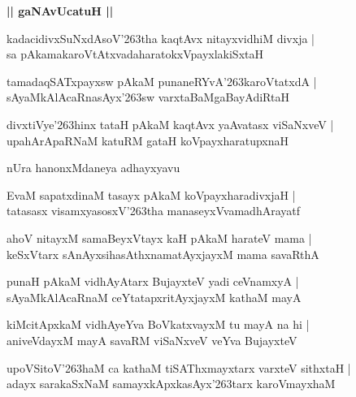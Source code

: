 \documentclass[twoside,12pt,openright]{book}
\def\S{\char'263}
\newcounter{shloka}[chapter]
\def\uvaca#1{\centerline{{\large\textbf{#1}}}}
\begin{document}
\uvaca{|| gaNAvUcatuH ||}

\begin{shloka}%
kadacidivxSuNxdAsoV\S tha kaqtAvx nitayxvidhiM divxja |\\
sa pAkamakaroVtAtxvadaharatokxVpayxlakiSxtaH 
\end{shloka}

\begin{shloka}%
tamadaqSATxpayxsw pAkaM punaneRYvA\S karoVtatxdA |\\
sAyaMkAlAcaRnasAyx\S sw varxtaBaMgaBayAdiRtaH 
\end{shloka}

\begin{shloka}%
divxtiVye\S hinx tataH pAkaM kaqtAvx yaAvatasx viSaNxveV |\\
upahArApaRNaM katuRM gataH koVpayxharatupxnaH 
\end{shloka}

\begin{center}
nUra hanonxMdaneya adhayxyavu
\end{center}

\begin{shloka}%
EvaM sapatxdinaM tasayx pAkaM koVpayxharadivxjaH |\\
tatasasx visamxyasosxV\S tha manaseyxVvamadhArayatf 
\end{shloka}

\begin{shloka}%
ahoV nitayxM samaBeyxVtayx kaH pAkaM harateV mama |\\
keSxVtarx sAnAyxsihasAthxnamatAyxjayxM mama savaRthA
\end{shloka}

\begin{shloka}%
punaH pAkaM vidhAyAtarx BujayxteV yadi ceVnamxyA |\\
sAyaMkAlAcaRnaM ceYtatapxritAyxjayxM kathaM mayA 
\end{shloka}

\begin{shloka}%
kiMcitApxkaM vidhAyeYva BoVkatxvayxM tu mayA na hi |\\
aniveVdayxM mayA savaRM viSaNxveV veYva BujayxteV 
\end{shloka}

\begin{shloka}%
upoVSitoV\S haM ca kathaM tiSAThxmayxtarx varxteV sithxtaH |\\
adayx sarakaSxNaM samayxkApxkasAyx\S tarx karoVmayxhaM 
\end{shloka}
\end{document}
